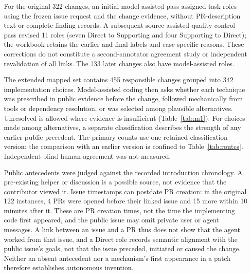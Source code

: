 \documentclass[acmsmall,screen,nonacm]{acmart}
\begin{document}
For the original 322 changes, an initial model-assisted pass assigned task roles using the frozen issue request and the change evidence, without PR-description text or complete finding records. A subsequent source-assisted quality-control pass revised 11 roles (seven Direct to Supporting and four Supporting to Direct); the workbook retains the earlier and final labels and case-specific reasons. These corrections do not constitute a second-annotator agreement study or independent revalidation of all links. The 133 later changes also have model-assisted roles.

The extended mapped set contains 455 responsible changes grouped into 342 implementation choices. Model-assisted coding then asks whether each technique was prescribed in public evidence before the change, followed mechanically from tools or dependency resolution, or was selected among plausible alternatives. Unresolved is allowed where evidence is insufficient (Table~\ref{tab:m1}). For choices made among alternatives, a separate classification describes the strength of any earlier public precedent. The primary counts use one retained classification version; the comparison with an earlier version is confined to Table~\ref{tab:routes}. Independent blind human agreement was not measured.

Public antecedents were judged against the recorded introduction chronology. A pre-existing helper or discussion is a possible source, not evidence that the contributor viewed it. Issue timestamps can postdate PR creation: in the original 122 instances, 4 PRs were opened before their linked issue and 15 more within 10 minutes after it. These are PR creation times, not the time the implementing code first appeared, and the public issue may omit private user or agent messages. A link between an issue and a PR thus does not show that the agent worked from that issue, and a Direct role records semantic alignment with the public issue's goals, not that the issue preceded, initiated or caused the change. Neither an absent antecedent nor a mechanism's first appearance in a patch therefore establishes autonomous invention.
\end{document}
